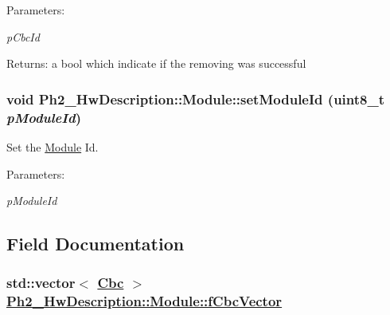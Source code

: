 \begin{Desc}
\item[Parameters:]
\begin{description}
\item[{\em p\-Cbc\-Id}]\end{description}
\end{Desc}
\begin{Desc}
\item[Returns:]a bool which indicate if the removing was successful \end{Desc}
\hypertarget{class_ph2___hw_description_1_1_module_4f404f856fdfd3af1459cf47baab1a51}{
\subsubsection[setModuleId]{\setlength{\rightskip}{0pt plus 5cm}void Ph2\_\-Hw\-Description::Module::set\-Module\-Id (uint8\_\-t {\em p\-Module\-Id})}}
\label{class_ph2___hw_description_1_1_module_4f404f856fdfd3af1459cf47baab1a51}


Set the \hyperlink{class_ph2___hw_description_1_1_module}{Module} Id. 

\begin{Desc}
\item[Parameters:]
\begin{description}
\item[{\em p\-Module\-Id}]\end{description}
\end{Desc}


\subsection{Field Documentation}
\hypertarget{class_ph2___hw_description_1_1_module_b5cfd93bf927592f609d31f66cd4161b}{
\subsubsection[fCbcVector]{\setlength{\rightskip}{0pt plus 5cm}std::vector$<$ \hyperlink{class_ph2___hw_description_1_1_cbc}{Cbc} $>$ \hyperlink{class_ph2___hw_description_1_1_module_b5cfd93bf927592f609d31f66cd4161b}{Ph2\_\-Hw\-Description::Module::f\-Cbc\-Vector}}}
\label{class_ph2___hw_description_1_1_module_b5cfd93bf927592f609d31f66cd4161b}



